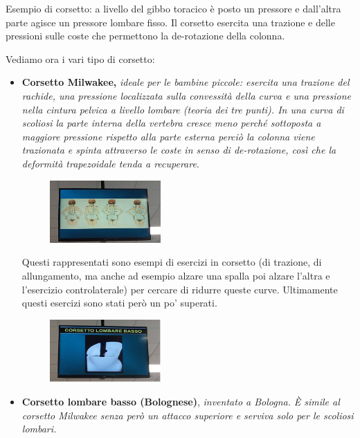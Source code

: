 Esempio di corsetto: a livello del gibbo toracico è posto un pressore e dall'altra parte agisce un pressore lombare fisso. Il corsetto esercita una trazione e delle pressioni sulle coste che permettono la de-rotazione della colonna.

Vediamo ora i vari tipo di corsetto:

\begin{itemize}
\item \textbf{Corsetto Milwakee,} \emph{ideale per le bambine piccole:
esercita una trazione del rachide, una pressione localizzata sulla convessità della curva e una pressione nella cintura pelvica a livello lombare (teoria dei tre punti). In una curva di scoliosi la parte interna della vertebra cresce meno perché sottoposta a maggiore pressione rispetto alla parte esterna perciò la colonna viene trazionata e spinta attraverso le coste in senso di de-rotazione, così che la deformità trapezoidale tenda a recuperare}.

\begin{figure}[!ht]
\centering
\includegraphics[width=0.4\textwidth]{013/image4.jpeg}
\end{figure}

Questi rappresentati sono esempi di esercizi in corsetto (di trazione, di allungamento, ma anche ad esempio alzare una spalla poi alzare l'altra e l'esercizio controlaterale) per cercare di ridurre queste curve.
Ultimamente questi esercizi sono stati però un po' superati.

\begin{figure}[!ht]
\centering
\includegraphics[width=0.4\textwidth]{013/image5.png}
\end{figure}

\item \textbf{Corsetto lombare basso (Bolognese)}, \emph{inventato a Bologna.}
\emph{È simile al corsetto Milwakee senza però un attacco superiore e serviva solo per le scoliosi lombari.}


\end{itemize}
